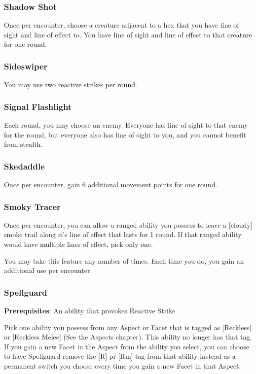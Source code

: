 \begin{multicols*}{2}
\subsubsection{Shadow Shot}
Once per encounter, choose a creature adjacent to a hex that you have line of sight and line of effect to. You have line of sight and line of effect to that creature for one round.

\subsubsection{Sideswiper}
You may use two reactive strikes per round.

\subsubsection{Signal Flashlight}
Each round, you may choose an enemy. Everyone has line of sight to that enemy for the round, but everyone also has line of sight to you, and you cannot benefit from stealth.

\subsubsection{Skedaddle}
Once per encounter, gain 6 additional movement points for one round.

\subsubsection{Smoky Tracer}
Once per encounter, you can allow a ranged ability you possess to leave a [cloudy] smoke trail along it’s line of effect that lasts for 1 round. If that ranged ability would have multiple lines of effect, pick only one.

You may take this feature any number of times. Each time you do, you gain an additional use per encounter.

\subsubsection{Spellguard}
\textbf{Prerequisites}: An ability that provokes Reactive Strike

Pick one ability you possess from any Aspect or Facet that is tagged as [Reckless] or [Reckless Melee] (See the Aspects chapter). This ability no longer has that tag. If you gain a new Facet in the Aspect from the ability you select, you can choose to have Spellguard remove the [R] pr [Rm] tag from that ability instead as a permanent switch you choose every time you gain a new Facet in that Aspect.


\end{multicols*}
